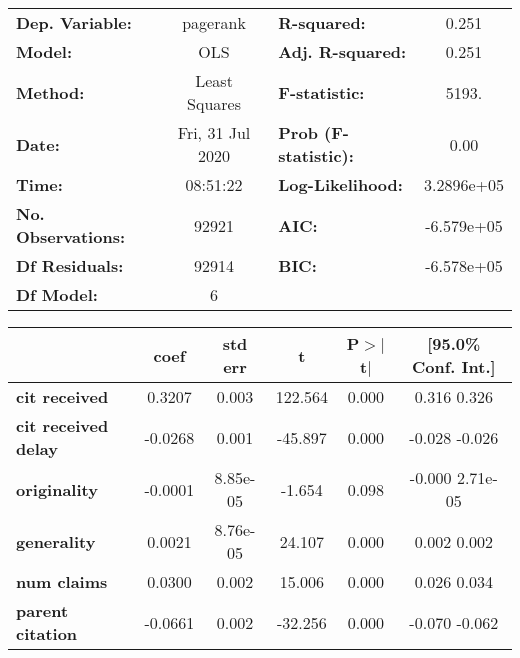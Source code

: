 \begin{center}
\begin{tabular}{lclc}
\toprule
\textbf{Dep. Variable:}     &     pagerank     & \textbf{  R-squared:         } &       0.251     \\
\textbf{Model:}             &       OLS        & \textbf{  Adj. R-squared:    } &       0.251     \\
\textbf{Method:}            &  Least Squares   & \textbf{  F-statistic:       } &       5193.     \\
\textbf{Date:}              & Fri, 31 Jul 2020 & \textbf{  Prob (F-statistic):} &       0.00      \\
\textbf{Time:}              &     08:51:22     & \textbf{  Log-Likelihood:    } &   3.2896e+05    \\
\textbf{No. Observations:}  &       92921      & \textbf{  AIC:               } &   -6.579e+05    \\
\textbf{Df Residuals:}      &       92914      & \textbf{  BIC:               } &   -6.578e+05    \\
\textbf{Df Model:}          &           6      & \textbf{                     } &                 \\
\bottomrule
\end{tabular}
\begin{tabular}{lccccc}
                            & \textbf{coef} & \textbf{std err} & \textbf{t} & \textbf{P$>$$|$t$|$} & \textbf{[95.0\% Conf. Int.]}  \\
\midrule
\textbf{cit received}       &       0.3207  &        0.003     &   122.564  &         0.000        &         0.316     0.326       \\
\textbf{cit received delay} &      -0.0268  &        0.001     &   -45.897  &         0.000        &        -0.028    -0.026       \\
\textbf{originality}        &      -0.0001  &     8.85e-05     &    -1.654  &         0.098        &        -0.000  2.71e-05       \\
\textbf{generality}         &       0.0021  &     8.76e-05     &    24.107  &         0.000        &         0.002     0.002       \\
\textbf{num claims}         &       0.0300  &        0.002     &    15.006  &         0.000        &         0.026     0.034       \\
\textbf{parent citation}    &      -0.0661  &        0.002     &   -32.256  &         0.000        &        -0.070    -0.062       \\

\end{tabular}
\end{center}
